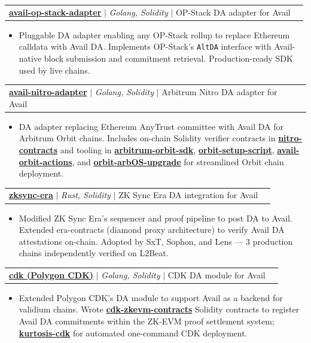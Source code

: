 \documentclass[letterpaper,11pt]{article}
\makeatletter
\newcommand{\resumeItem}[1]{
  \item\small{
    {#1 \vspace{-2pt}}
  }
}
\newcommand{\resumeProjectHeading}[2]{
    \item
    \begin{tabular*}{0.97\textwidth}{l@{\extracolsep{\fill}}r}
      \small#1 & #2 \\
    \end{tabular*}\vspace{-7pt}
}
\newcommand{\resumeItemListStart}{\begin{itemize}}
\newcommand{\resumeItemListEnd}{\end{itemize}\vspace{-5pt}}
\makeatother
\begin{document}
    \resumeProjectHeading
      {\textbf{\href{https://github.com/availproject/avail-op-stack-adapter}{avail-op-stack-adapter}} $|$ \emph{Golang, Solidity} $|$ OP-Stack DA adapter for Avail}{}
      \resumeItemListStart
        \resumeItem{Pluggable DA adapter enabling any OP-Stack rollup to replace Ethereum calldata with Avail DA. Implements OP-Stack's \texttt{AltDA} interface with Avail-native block submission and commitment retrieval. Production-ready SDK used by live chains.}
      \resumeItemListEnd

    \resumeProjectHeading
      {\textbf{\href{https://github.com/availproject/avail-nitro-adapter}{avail-nitro-adapter}} $|$ \emph{Golang, Solidity} $|$ Arbitrum Nitro DA adapter for Avail}{}
      \resumeItemListStart
        \resumeItem{DA adapter replacing Ethereum AnyTrust committee with Avail DA for Arbitrum Orbit chains. Includes on-chain Solidity verifier contracts in \href{https://github.com/availproject/nitro-contracts}{\textbf{nitro-contracts}} and tooling in \href{https://github.com/availproject/arbitrum-orbit-sdk}{\textbf{arbitrum-orbit-sdk}}, \href{https://github.com/availproject/orbit-setup-script}{\textbf{orbit-setup-script}}, \href{https://github.com/availproject/avail-orbit-actions}{\textbf{avail-orbit-actions}}, and \href{https://github.com/availproject/orbit-arbOS-upgrade}{\textbf{orbit-arbOS-upgrade}} for streamlined Orbit chain deployment.}
      \resumeItemListEnd

    \resumeProjectHeading
      {\textbf{\href{https://github.com/availproject/zksync-era}{zksync-era}} $|$ \emph{Rust, Solidity} $|$ ZK Sync Era DA integration for Avail}{}
      \resumeItemListStart
        \resumeItem{Modified ZK Sync Era's sequencer and proof pipeline to post DA to Avail. Extended era-contracts (diamond proxy architecture) to verify Avail DA attestations on-chain. Adopted by SxT, Sophon, and Lens --- 3 production chains independently verified on L2Beat.}
      \resumeItemListEnd

    \resumeProjectHeading
      {\textbf{\href{https://github.com/availproject/cdk}{cdk (Polygon CDK)}} $|$ \emph{Golang, Solidity} $|$ CDK DA module for Avail}{}
      \resumeItemListStart
        \resumeItem{Extended Polygon CDK's DA module to support Avail as a backend for validium chains. Wrote \href{https://github.com/availproject/cdk-zkevm-contracts}{\textbf{cdk-zkevm-contracts}} Solidity contracts to register Avail DA commitments within the ZK-EVM proof settlement system; \href{https://github.com/availproject/kurtosis-cdk}{\textbf{kurtosis-cdk}} for automated one-command CDK deployment.}
      \resumeItemListEnd
\end{document}
